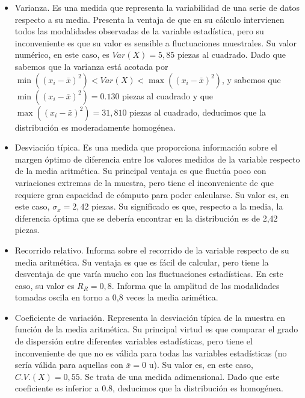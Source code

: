 \begin{itemize}
	\item Varianza. Es una medida que representa la variabilidad de una serie de datos respecto a su media. Presenta la ventaja de que en su cálculo intervienen todos las modalidades observadas de la variable estadística, pero su inconveniente es que su valor es sensible a fluctuaciones muestrales. Su valor numérico, en este caso, es $Var(X) = 5,85$ piezas al cuadrado. Dado que sabemos que la varianza está acotada por $\min((x_{i} - \bar x)^2) < Var(X) < \max((x_{i} - \bar x)^2)$, y sabemos que $\min((x_{i} - \bar x)^2) = 0.130$ piezas al cuadrado y que $\max((x_{i} - \bar x)^2) = 31,810$ piezas al cuadrado, deducimos que la distribución es moderadamente homogénea.
	
	\item Desviación típica. Es una medida que proporciona información sobre el margen óptimo de diferencia entre los valores medidos de la variable respecto de la media aritmética. Su principal ventaja es que fluctúa poco con variaciones extremas de la muestra, pero tiene el inconveniente de que requiere gran capacidad de cómputo para poder calcularse. Su valor es, en este caso, $\sigma_{x} = 2,42$ piezas. Su significado es que, respecto a la media, la diferencia óptima que se debería encontrar en la distribución es de 2,42 piezas.
	
	\item Recorrido relativo. Informa sobre el recorrido de la variable respecto de su media aritmética. Su ventaja es que es fácil de calcular, pero tiene la desventaja de que varía mucho con las fluctuaciones estadísticas. En este caso, su valor es $R_{R} = 0,8$. Informa que la amplitud de las modalidades tomadas oscila en torno a 0,8 veces la media arimética.
	
	
	\item Coeficiente de variación. Representa la desviación típica de la muestra en función de la media aritmética. Su principal virtud es que comparar el grado de dispersión entre diferentes variables estadísticas, pero tiene el inconveniente de que no es válida para todas las variables estadísticas (no sería válida para aquellas con $\bar x = 0$ u). Su valor es, en este caso, $C.V.(X) = 0,55$. Se trata de una medida adimensional. Dado que este coeficiente es inferior a 0.8, deducimos que la distribución es homogénea. 
	
\end{itemize}




